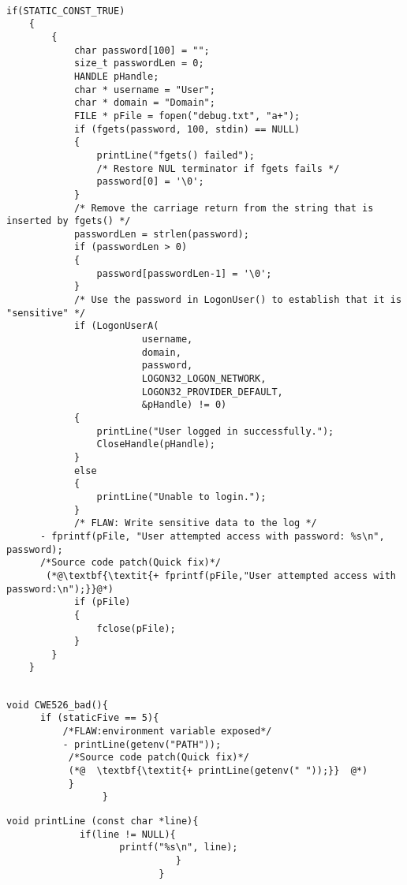 \begin{lstlisting}[caption={CWE-534 test programs source},label={lst:CWE534}]

if(STATIC_CONST_TRUE)
    {
        {
            char password[100] = "";
            size_t passwordLen = 0;
            HANDLE pHandle;
            char * username = "User";
            char * domain = "Domain";
            FILE * pFile = fopen("debug.txt", "a+");
            if (fgets(password, 100, stdin) == NULL)
            {
                printLine("fgets() failed");
                /* Restore NUL terminator if fgets fails */
                password[0] = '\0';
            }
            /* Remove the carriage return from the string that is inserted by fgets() */
            passwordLen = strlen(password);
            if (passwordLen > 0)
            {
                password[passwordLen-1] = '\0';
            }
            /* Use the password in LogonUser() to establish that it is "sensitive" */
            if (LogonUserA(
                        username,
                        domain,
                        password,
                        LOGON32_LOGON_NETWORK,
                        LOGON32_PROVIDER_DEFAULT,
                        &pHandle) != 0)
            {
                printLine("User logged in successfully.");
                CloseHandle(pHandle);
            }
            else
            {
                printLine("Unable to login.");
            }
            /* FLAW: Write sensitive data to the log */
      - fprintf(pFile, "User attempted access with password: %s\n", password);
      /*Source code patch(Quick fix)*/
       (*@\textbf{\textit{+ fprintf(pFile,"User attempted access with password:\n");}}@*)
            if (pFile)
            {
                fclose(pFile);
            }
        }
    }
\end{lstlisting}








\begin{lstlisting}[caption={CWE-526 test programs source},label={lst:CWE526source}]

void CWE526_bad(){
      if (staticFive == 5){
          /*FLAW:environment variable exposed*/
          - printLine(getenv("PATH"));
           /*Source code patch(Quick fix)*/
           (*@  \textbf{\textit{+ printLine(getenv(" "));}}  @*) 
           }
                 }
\end{lstlisting}
 

\begin{lstlisting}[caption={CWE-526 test programs sink},label={lst:CWE526sink}]
void printLine (const char *line){
             if(line != NULL){
                    printf("%s\n", line);
                              }
                           }
\end{lstlisting}


